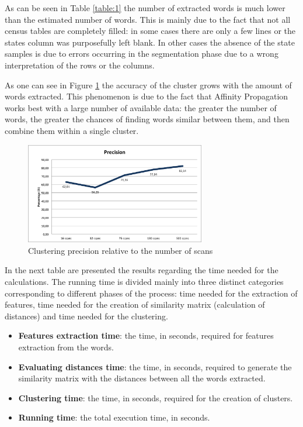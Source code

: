 As can be seen in Table \ref{table:1} the number of extracted words is much lower than the estimated number of words. This is mainly due to the fact that not all census tables are completely filled: in some cases there are only a few lines or the states column was purposefully left blank. In other cases the absence of the state samples is due to errors occurring in the segmentation phase due to a wrong interpretation of the rows or the columns.

As one can see in Figure \ref{fig:precision} the accuracy of the cluster grows with the amount of words extracted. This phenomenon is due to the fact that Affinity Propagation works best with a large number of available data: the greater the number of words, the greater the chances of finding words similar between them, and then combine them within a single cluster.


\begin{figure}[H]
\centering
\includegraphics[width=0.7\textwidth]{images/precisione.png}
\caption{Clustering precision relative to the number of scans}
\label{fig:precision}
\end{figure}

In the next table are presented the results regarding the time needed for the calculations. The running time is divided mainly into three distinct categories corresponding to different phases of the process: time needed for the extraction of features, time needed for the creation of similarity matrix (calculation of distances) and time needed for the clustering.

\begin{itemize}
\item \textbf{Features extraction time}: the time, in seconds, required for features extraction from the words.
\item \textbf{Evaluating distances time}: the time, in seconds, required to generate the similarity matrix with the distances between all the words extracted.
\item \textbf{Clustering time}: the time, in seconds, required for the creation of clusters.
\item \textbf{Running time}: the total execution time, in seconds.
\end{itemize}


